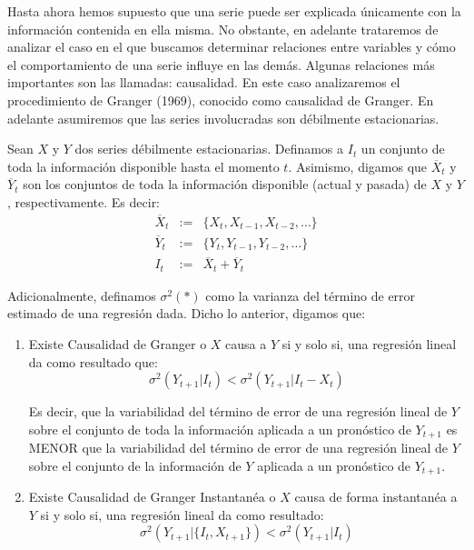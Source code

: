 \documentclass[
]{book}
\begin{document}
Hasta ahora hemos supuesto que una serie puede ser explicada únicamente
con la información contenida en ella misma. No obstante, en adelante
trataremos de analizar el caso en el que buscamos determinar relaciones
entre variables y cómo el comportamiento de una serie influye en las
demás. Algunas relaciones más importantes son las llamadas: causalidad.
En este caso analizaremos el procedimiento de Granger (1969), conocido
como causalidad de Granger. En adelante asumiremos que las series
involucradas son débilmente estacionarias.

Sean \(X\) y \(Y\) dos series débilmente estacionarias. Definamos a \(I_t\) un
conjunto de toda la información disponible hasta el momento \(t\).
Asimismo, digamos que \(\overline{X}_t\) y \(\overline{Y}_t\) son los
conjuntos de toda la información disponible (actual y pasada) de \(X\) y
\(Y\), respectivamente. Es decir: \begin{eqnarray*}
    \overline{X}_t & := & \{ X_t, X_{t-1}, X_{t-2}, \ldots \} \\
    \overline{Y}_t & := & \{ Y_t, Y_{t-1}, Y_{t-2}, \ldots \} \\
    I_t & := & \overline{X}_t + \overline{Y}_t
\end{eqnarray*}

Adicionalmente, definamos \(\sigma^2(*)\) como la varianza del término de
error estimado de una regresión dada. Dicho lo anterior, digamos que:

\begin{enumerate}
  \item Existe Causalidad de Granger o $X$ causa a $Y$ si y solo si, una regresión lineal da como resultado que: 
    \begin{equation}
        \sigma^2 (Y_{t+1} | I_t) < \sigma^2 (Y_{t+1} | I_t - X_t)    
    \end{equation}

Es decir, que la variabilidad del término de error de una regresión lineal de $Y$ sobre el conjunto de toda la información aplicada a un pronóstico de $Y_{t+1}$ es MENOR que la variabilidad del término de error de una regresión lineal de $Y$ sobre el conjunto de la información de $Y$ aplicada a un pronóstico de $Y_{t+1}$.

  \item Existe Causalidad de Granger Instantanéa o $X$ causa de forma instantanéa a $Y$ si y solo si, una regresión lineal da como resultado:
    \begin{equation}
        \sigma^2 (Y_{t+1} | \{ I_t, X_{t+1} \}) < \sigma^2 (Y_{t+1} | I_t)
    \end{equation}
\end{enumerate}
\end{document}
